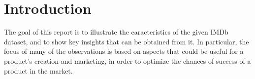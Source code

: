 \section*{Introduction}
The goal of this report is to illustrate the caracteristics of the
given IMDb dataset, and to show key insights that can be
obtained from it.
In particular, the focus of many of the observations is based on
aspects that could be useful for a product's creation and marketing,
in order to optimize the chances of success of a product
in the market.

